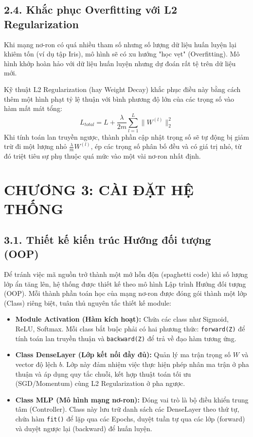 \documentclass[13pt,a4paper]{article}
\begin{document}
\subsection*{2.4. Khắc phục Overfitting với L2 Regularization}
Khi mạng nơ-ron có quá nhiều tham số nhưng số lượng dữ liệu huấn luyện lại khiêm tốn (ví dụ tập Iris), mô hình sẽ có xu hướng "học vẹt" (Overfitting). Mô hình khớp hoàn hảo với dữ liệu huấn luyện nhưng dự đoán rất tệ trên dữ liệu mới.

Kỹ thuật L2 Regularization (hay Weight Decay) khắc phục điều này bằng cách thêm một hình phạt tỷ lệ thuận với bình phương độ lớn của các trọng số vào hàm mất mát tổng:
\[
L_{total} = L + \frac{\lambda}{2m} \sum_{l=1}^{L} \|W^{(l)}\|_2^2
\]
Khi tính toán lan truyền ngược, thành phần cập nhật trọng số sẽ tự động bị giảm trừ đi một lượng nhỏ $\frac{\lambda}{m} W^{(l)}$, ép các trọng số phân bố đều và có giá trị nhỏ, từ đó triệt tiêu sự phụ thuộc quá mức vào một vài nơ-ron nhất định.

\section*{CHƯƠNG 3: CÀI ĐẶT HỆ THỐNG}
\subsection*{3.1. Thiết kế kiến trúc Hướng đối tượng (OOP)}
Để tránh việc mã nguồn trở thành một mớ hỗn độn (spaghetti code) khi số lượng lớp ẩn tăng lên, hệ thống được thiết kế theo mô hình Lập trình Hướng đối tượng (OOP). Mỗi thành phần toán học của mạng nơ-ron được đóng gói thành một lớp (Class) riêng biệt, tuân thủ nguyên tắc thiết kế module:

\begin{itemize}
    \item \textbf{Module Activation (Hàm kích hoạt):} Chứa các class như Sigmoid, ReLU, Softmax. Mỗi class bắt buộc phải có hai phương thức: \texttt{forward(Z)} để tính toán lan truyền thuận và \texttt{backward(Z)} để trả về đạo hàm tương ứng.
    \item \textbf{Class DenseLayer (Lớp kết nối đầy đủ):} Quản lý ma trận trọng số $W$ và vector độ lệch $b$. Lớp này đảm nhiệm việc thực hiện phép nhân ma trận ở pha thuận và áp dụng quy tắc chuỗi, kết hợp thuật toán tối ưu (SGD/Momentum) cùng L2 Regularization ở pha ngược.
    \item \textbf{Class MLP (Mô hình mạng nơ-ron):} Đóng vai trò là bộ điều khiển trung tâm (Controller). Class này lưu trữ danh sách các DenseLayer theo thứ tự, chứa hàm \texttt{fit()} để lặp qua các Epochs, duyệt tuần tự qua các lớp (forward) và duyệt ngược lại (backward) để huấn luyện.
\end{itemize}
\end{document}
